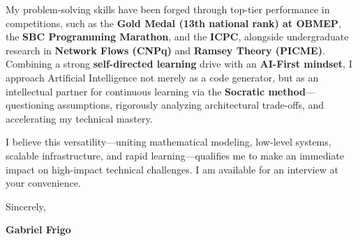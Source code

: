 \documentclass[letterpaper,10pt]{article}
\begin{document}
My problem-solving skills have been forged through top-tier performance in competitions, such as the \textbf{Gold Medal (13th national rank) at OBMEP}, the \textbf{SBC Programming Marathon}, and the \textbf{ICPC}, alongside undergraduate research in \textbf{Network Flows (CNPq)} and \textbf{Ramsey Theory (PICME)}. Combining a strong \textbf{self-directed learning} drive with an \textbf{AI-First mindset}, I approach Artificial Intelligence not merely as a code generator, but as an intellectual partner for continuous learning via the \textbf{Socratic method}---questioning assumptions, rigorously analyzing architectural trade-offs, and accelerating my technical mastery.

I believe this versatility---uniting mathematical modeling, low-level systems, scalable infrastructure, and rapid learning---qualifies me to make an immediate impact on high-impact technical challenges. I am available for an interview at your convenience.

Sincerely,

\textbf{Gabriel Frigo}
\end{document}
